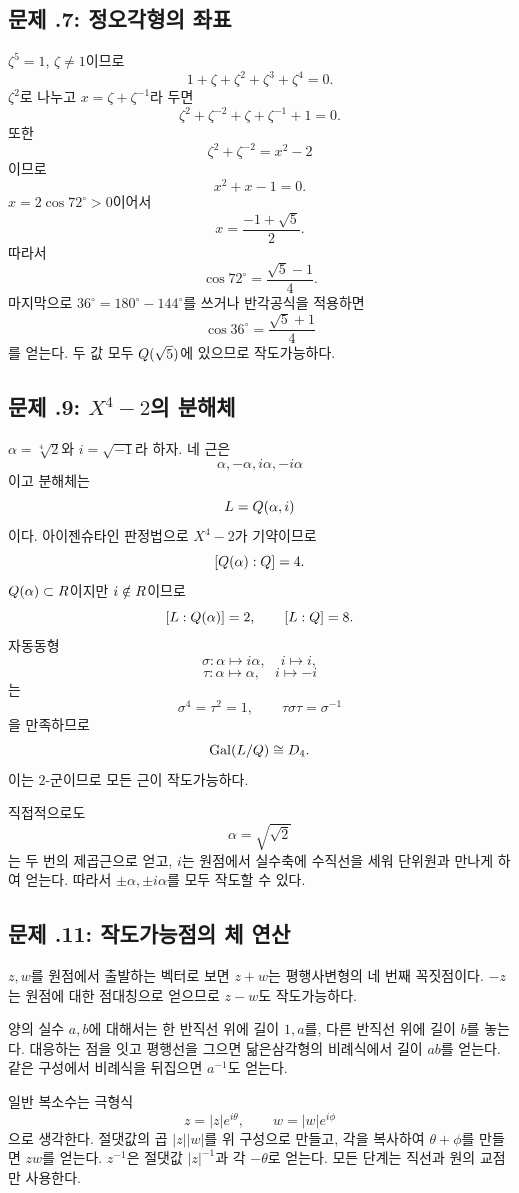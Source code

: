 \subsection*{문제 \thechapter.7: 정오각형의 좌표}

\begin{solution}
$\zeta^5=1$, $\zeta\ne1$이므로
\[
  1+\zeta+\zeta^2+\zeta^3+\zeta^4=0.
\]
$\zeta^2$로 나누고 $x=\zeta+\zeta^{-1}$라 두면
\[
  \zeta^2+\zeta^{-2}+\zeta+\zeta^{-1}+1=0.
\]
또한
\[
  \zeta^2+\zeta^{-2}=x^2-2
\]
이므로
\[
  x^2+x-1=0.
\]
$x=2\cos72^\circ>0$이어서
\[
  x=\frac{-1+\sqrt5}{2}.
\]
따라서
\[
  \cos72^\circ=\frac{\sqrt5-1}{4}.
\]
마지막으로 $36^\circ=180^\circ-144^\circ$를 쓰거나 반각공식을 적용하면
\[
  \cos36^\circ=\frac{\sqrt5+1}{4}
\]
를 얻는다. 두 값 모두 $Q(\sqrt5)$에 있으므로 작도가능하다.
\end{solution}

\subsection*{문제 \thechapter.9: $X^4-2$의 분해체}

\begin{solution}
$\alpha=\sqrt[4]2$와 $i=\sqrt{-1}$라 하자. 네 근은
\[
  \alpha,-\alpha,i\alpha,-i\alpha
\]
이고 분해체는
\[
  L=Q(\alpha,i)
\]
이다. 아이젠슈타인 판정법으로 $X^4-2$가 기약이므로
\[
  [Q(\alpha):Q]=4.
\]
$Q(\alpha)\subset R$이지만 $i\notin R$이므로
\[
  [L:Q(\alpha)]=2,
  \qquad [L:Q]=8.
\]
자동동형
\[
  \sigma:\alpha\mapsto i\alpha,\quad i\mapsto i,
\]
\[
  \tau:\alpha\mapsto\alpha,\quad i\mapsto-i
\]
는
\[
  \sigma^4=\tau^2=1,
  \qquad \tau\sigma\tau=\sigma^{-1}
\]
을 만족하므로
\[
  \operatorname{Gal}(L/Q)\cong D_4.
\]
이는 $2$-군이므로 모든 근이 작도가능하다.

직접적으로도
\[
  \alpha=\sqrt{\sqrt2}
\]
는 두 번의 제곱근으로 얻고, $i$는 원점에서 실수축에 수직선을 세워 단위원과 만나게 하여 얻는다. 따라서 $\pm\alpha,\pm i\alpha$를 모두 작도할 수 있다.
\end{solution}

\subsection*{문제 \thechapter.11: 작도가능점의 체 연산}

\begin{solution}
$z,w$를 원점에서 출발하는 벡터로 보면 $z+w$는 평행사변형의 네 번째 꼭짓점이다. $-z$는 원점에 대한 점대칭으로 얻으므로 $z-w$도 작도가능하다.

양의 실수 $a,b$에 대해서는 한 반직선 위에 길이 $1,a$를, 다른 반직선 위에 길이 $b$를 놓는다. 대응하는 점을 잇고 평행선을 그으면 닮은삼각형의 비례식에서 길이 $ab$를 얻는다. 같은 구성에서 비례식을 뒤집으면 $a^{-1}$도 얻는다.

일반 복소수는 극형식
\[
  z=|z|e^{i\theta},\qquad w=|w|e^{i\phi}
\]
으로 생각한다. 절댓값의 곱 $|z||w|$를 위 구성으로 만들고, 각을 복사하여 $\theta+\phi$를 만들면 $zw$를 얻는다. $z^{-1}$은 절댓값 $|z|^{-1}$과 각 $-\theta$로 얻는다. 모든 단계는 직선과 원의 교점만 사용한다.
\end{solution}

